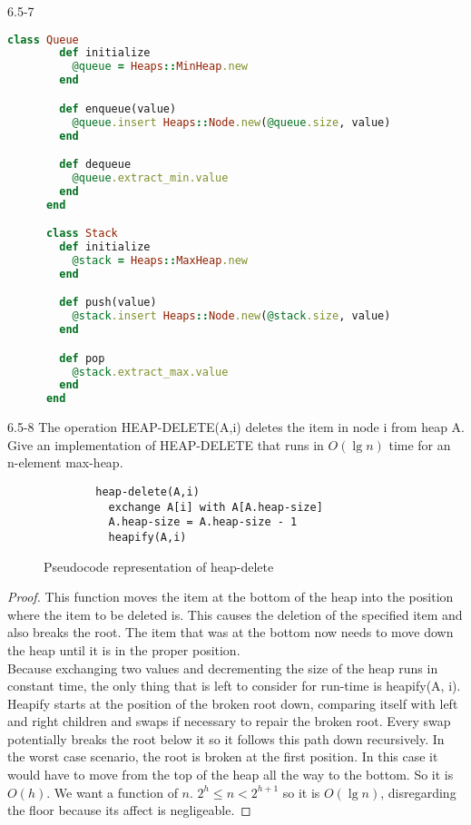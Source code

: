 \begin{problem}{6.5-7}
\begin{solution}
\begin{lstlisting}[language=Ruby]
      class Queue
        def initialize
          @queue = Heaps::MinHeap.new
        end

        def enqueue(value)
          @queue.insert Heaps::Node.new(@queue.size, value)
        end

        def dequeue
          @queue.extract_min.value
        end
      end

      class Stack
        def initialize
          @stack = Heaps::MaxHeap.new
        end

        def push(value)
          @stack.insert Heaps::Node.new(@stack.size, value)
        end

        def pop
          @stack.extract_max.value
        end
      end
    \end{lstlisting}
  \end{solution}
\end{problem}

\begin{problem}{6.5-8}
  The operation HEAP-DELETE(A,i) deletes the item in node i from heap A. Give an implementation of HEAP-DELETE that runs
  in $O(\lg n)$ time for an n-element max-heap.
  \begin{solution}
    \begin{figure}[here]
      \caption{Pseudocode representation of heap-delete}
      \centering
      \begin{lstlisting}
        heap-delete(A,i)
          exchange A[i] with A[A.heap-size]
          A.heap-size = A.heap-size - 1
          heapify(A,i)
      \end{lstlisting}
    \end{figure}
    \begin{proof}
      This function moves the item at the bottom of the heap into the position where the item to be deleted is.
      This causes the deletion of the specified item and also breaks the root. The item that was at the bottom now needs
      to move down the heap until it is in the proper position. \\

      Because exchanging two values and decrementing the size of the heap runs in constant time, the only thing that is
      left to consider for run-time is heapify(A, i). \\

      Heapify starts at the position of the broken root down, comparing itself with left and right children
      and swaps if necessary to repair the broken root. Every swap potentially breaks the root below it so it follows this
      path down recursively. In the worst case scenario, the root is broken at the first position. In this case it would
      have to move from the top of the heap all the way to the bottom. So it is $O(h)$. We want a function of $n$.
      $2^h \le n < 2^{h+1}$ so it is $O(\lg n)$, disregarding the floor because its affect is negligeable.
    \end{proof}
  \end{solution}
\end{problem}

